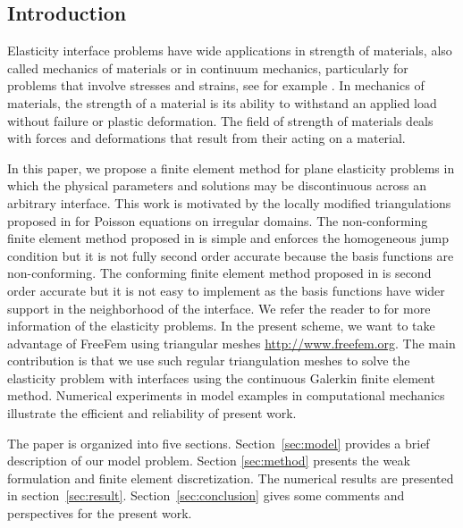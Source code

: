 \documentclass[notitlepage,a4paper,fleqn,9pt]{icmfarticle}
\begin{document}
\begin{multicols}{2}
\section{Introduction}
\label{sec:introduction}
Elasticity interface problems have wide applications in strength of materials, also called mechanics of materials or in continuum mechanics, particularly for problems that involve stresses and strains, see for example \cite{Yu86,FS96}. In mechanics of materials, the strength of a material is its ability to withstand an applied load without failure or plastic deformation. The field of strength of materials deals with forces and deformations that result from their acting on a material.

In this paper, we propose a finite element method for plane elasticity problems in which the physical parameters and solutions may be discontinuous across an arbitrary interface. This work is motivated by the locally modified triangulations proposed in \cite{Bor90, XILT08} for Poisson equations on irregular domains. The non-conforming finite element method proposed in \cite{LLW03} is simple and enforces the homogeneous jump condition but it is not fully second order accurate because the basis functions are non-conforming. The conforming finite element method proposed in \cite{GLL08, LLW03} is second order accurate but it is not easy to implement as the basis functions have wider support in the neighborhood of the interface. 
We refer the reader to \cite{TG85,Sad05} for more information of the elasticity problems.
In the present scheme, we want to take advantage of FreeFem using triangular meshes \url{http://www.freefem.org}. The main contribution is that we use such regular triangulation meshes to solve the elasticity problem with interfaces using the continuous Galerkin finite element method. Numerical experiments in model examples in computational mechanics illustrate the efficient and reliability of present work.

The paper is organized into five sections. Section~\ref{sec:model} provides a brief description of our model problem. Section \ref{sec:method} presents the weak formulation and finite element discretization. The numerical results are presented in section~\ref{sec:result}. Section~\ref{sec:conclusion} gives some comments and perspectives for the present work.

\end{multicols}
\end{document}
